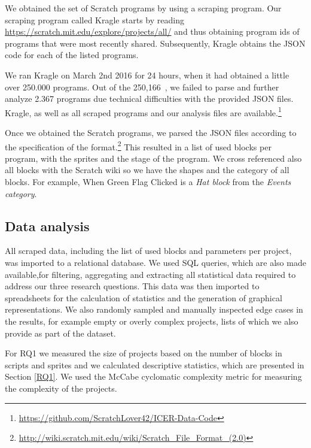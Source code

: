 \documentclass{sig-alternate}
\newcommand{\nPrograms}{250,166}
\begin{document}
We obtained the set of Scratch programs by using a scraping program. Our scraping program called Kragle starts by reading \url{https://scratch.mit.edu/explore/projects/all/} and thus obtaining program ids of programs that were most recently shared. Subsequently, Kragle obtains the JSON code for each of the listed programs. 


We ran Kragle on March 2nd 2016 for 24 hours, when it had obtained a little over 250.000 programs. Out of the \nPrograms~, we failed to parse and further analyze 2.367 programs due technical difficulties with the provided JSON files. Kragle, as well as all scraped programs and our analysis files are available.\footnote{\label{repo}\url{https://github.com/ScratchLover42/ICER-Data-Code}}

Once we obtained the Scratch programs, we parsed the JSON files according to the specification of the format.\footnote{\url{http://wiki.scratch.mit.edu/wiki/Scratch_File_Format_(2.0)}} This resulted in a list of used blocks per program, with the sprites and the stage of the program. We cross referenced also all blocks with the Scratch wiki so we have the shapes and the category of all blocks. For example, When Green Flag Clicked is a \emph{Hat block} from the \emph{Events category}.

\subsection{Data analysis}
\label{dataAnalysis}
All scraped data, including the list of used blocks and parameters per project, was imported to a relational database. We used SQL queries, which are also made available,\footnotemark[\ref{repo}] for filtering, aggregating and extracting all statistical data required to address our three research questions. This data was then imported to spreadsheets for the calculation of statistics and the generation of graphical representations. We also randomly sampled and manually inspected edge cases in the results, for example empty or overly complex projects, lists of which we also provide as part of the dataset.\footnotemark[\ref{repo}]

For RQ1 we measured the size of projects based on the number of blocks in scripts and sprites and we calculated descriptive statistics, which are presented in Section \ref{RQ1}. We used the McCabe cyclomatic complexity metric\cite{mcCabe76} for measuring the complexity of the projects.
\end{document}
